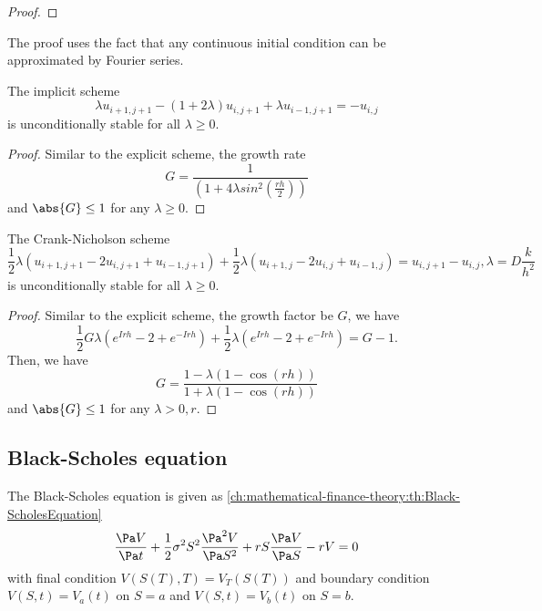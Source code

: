 \begin{refsection}
\begin{proof}
\end{proof}

\begin{remark}
	The proof uses the fact that any continuous initial condition can be approximated by Fourier series.
\end{remark}


\begin{lemma}
	The implicit scheme 
	$$\lambda u_{i+1,j+1} - (1+2\lambda) u_{i,j+1} + \lambda u_{i-1,j+1} = -u_{i,j}$$
	is unconditionally stable for all $\lambda \geq 0$.
\end{lemma}
\begin{proof}
Similar to the explicit scheme, the growth rate
$$G = \frac{1}{(1+4\lambda sin^2(\frac{rh}{2}))}$$
and $\abs{G}\leq 1$ for any $\lambda \geq 0$.
\end{proof}

\begin{lemma}
	The Crank-Nicholson scheme 
	$$\frac{1}{2} \lambda(u_{i+1,j+1} - 2u_{i,j+1} + u_{i-1,j+1}) + \frac{1}{2}\lambda(u_{i+1,j} - 2u_{i,j} + u_{i-1,j}) = u_{i,j+1}-u_{i,j}, \lambda = D\frac{k}{h^2}$$
	is unconditionally stable for all $\lambda\geq 0$.
\end{lemma}
\begin{proof}
	Similar to the explicit scheme, the growth factor be $G$, we have
	$$\frac{1}{2} G\lambda(e^{Irh} - 2 + e^{-Irh}) + \frac{1}{2}\lambda(e^{Irh} - 2 + e^{-Irh}) = G -1.$$
	Then, we have
	$$G = \frac{1 - \lambda (1-\cos(rh))}{1 + \lambda(1-\cos(rh))}$$
	and $\abs{G}\leq 1$ for any $\lambda > 0, r$.
\end{proof}

\subsection{Black-Scholes equation}
\begin{definition}
The Black-Scholes equation is given as \autoref{ch:mathematical-finance-theory:th:Black-ScholesEquation}
$$\frac{\Pa V}{\Pa t} + \frac{1}{2}\sigma^2 S^2 \frac{\Pa^2 V}{\Pa S^2} + rS\frac{\Pa V}{\Pa S} - rV = 0$$
with final condition $V(S(T),T) = V_T(S(T))$ and boundary condition $V(S,t) = V_a(t)$ on $S = a$ and $V(S,t) = V_b(t)$ on $S=b$. 
\end{definition}


\end{refsection}
